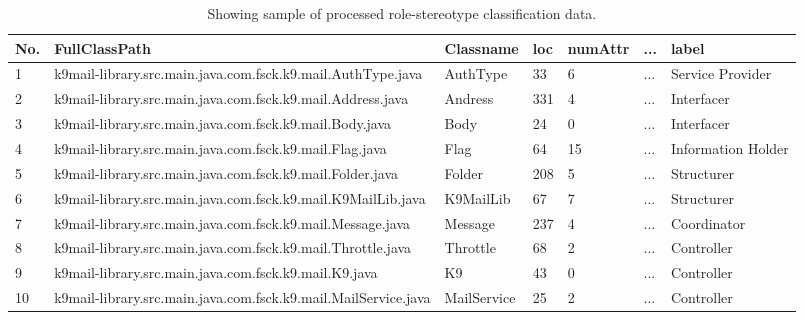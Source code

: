 \documentclass[AMA,Times1COL]{WileyNJDv5} %
\begin{document}
	\begin{table}
		\centering %
		\caption{Showing sample of processed role-stereotype classification data.} %
		\begin{tabular*}{\textwidth}{@{\extracolsep\fill}lllllll@{\extracolsep\fill}}%

				\toprule
			\textbf{No.}& \textbf{FullClassPath} & \textbf{Classname} & \textbf{loc} &\textbf{numAttr} & \textbf{...} & \textbf{label} \\ 
			\midrule %
			1 & k9mail-library.src.main.java.com.fsck.k9.mail.AuthType.java & AuthType & 33 & 6 & ... & Service Provider\\ %
			2 & k9mail-library.src.main.java.com.fsck.k9.mail.Address.java & Andress & 331 & 4 & ... & Interfacer \\
			3 & k9mail-library.src.main.java.com.fsck.k9.mail.Body.java & Body & 24 & 0 & ... & Interfacer\\
			4 & k9mail-library.src.main.java.com.fsck.k9.mail.Flag.java& Flag & 64 & 15 & ... & Information Holder\\ 
			5 & k9mail-library.src.main.java.com.fsck.k9.mail.Folder.java & Folder & 208 & 5 & ... & Structurer\\
			6 & k9mail-library.src.main.java.com.fsck.k9.mail.K9MailLib.java & K9MailLib & 67 & 7 & ... & Structurer\\
			7 & k9mail-library.src.main.java.com.fsck.k9.mail.Message.java & Message & 237 & 4 & ... & Coordinator\\
			8 &k9mail-library.src.main.java.com.fsck.k9.mail.Throttle.java & Throttle & 68 & 2 & ... & Controller \\
			9 & k9mail-library.src.main.java.com.fsck.k9.mail.K9.java & K9 & 43 & 0 & ... & Controller \\ 
			10 & k9mail-library.src.main.java.com.fsck.k9.mail.MailService.java & MailService & 25 & 2 & ... & Controller\\  %
			\bottomrule
		\end{tabular*}
		\label{table:rs_sample} %
	\end{table}
	
\end{document}
